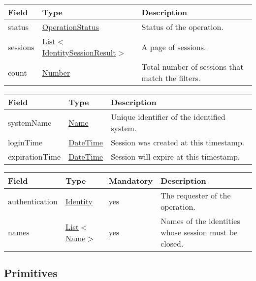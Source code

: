\documentclass[a4paper]{arrowhead}
\newcommand{\pref}[1]{{\textcolor{ArrowheadGrey}{\hyperref[sec:model:primitives:#1]{#1}}}}
\begin{document}

\begin{table}[ht!]
\begin{tabularx}{\textwidth}{| p{2.5cm} | p{4.5cm} | X |} \hline
\rowcolor{gray!33} Field & Type      & Description \\ \hline
status & \pref{OperationStatus} & Status of the operation. \\ \hline
sessions & \pref{List}$<$\hyperref[sec:model:IdentitySessionResult]{IdentitySessionResult}$>$ & A page of sessions. \\ \hline
count & \pref{Number} & Total number of sessions that match the filters. \\ \hline
\end{tabularx}
\end{table}

 
\begin{table}[ht!]
\begin{tabularx}{\textwidth}{| p{3.3cm} | p{4cm} | X |} \hline
\rowcolor{gray!33} Field & Type      & Description \\ \hline
systemName & \pref{Name} & Unique identifier of the identified system. \\ \hline
loginTime & \pref{DateTime} & Session was created at this timestamp. \\ \hline
expirationTime & \pref{DateTime} & Session will expire at this timestamp. \\ \hline
\end{tabularx}
\end{table}


\begin{table}[ht!]
\begin{tabularx}{\textwidth}{| p{2.5cm} | p{2.5cm} | p{2cm} | X |} \hline
\rowcolor{gray!33} Field & Type & Mandatory & Description \\ \hline
authentication & \hyperref[sec:model:Identity]{Identity} & yes & The requester of the operation. \\ \hline
names &  \pref{List}$<$\pref{Name}$>$ & yes & Names of the identities whose session must be closed. \\ \hline
\end{tabularx}
\end{table}

\subsection{Primitives}
\label{sec:model:primitives}
\end{document}
